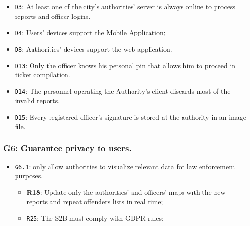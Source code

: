 \documentclass[12pt,a4paper]{article}
\begin{document}
	\begin{itemize}
			\item \texttt{D3}: At least one of the city's authorities' server is always online to process reports and officer logins.
			\item \texttt{D4}: Users' devices support the Mobile Application;
			\item \texttt{D8}: Authorities' devices support the web application.
			\item \texttt{D13}: Only the officer knows his personal pin that allows him to proceed in ticket compilation.
			\item \texttt{D14}: The personnel operating the Authority's client discards most of the invalid reports.
			\item \texttt{D15}: Every registered officer's signature is stored at the authority in an image file.
	\end{itemize}

\subsubsection{G6: Guarantee privacy to users.}
	
	\begin{itemize}
	\item \texttt{G6.1}: only allow authorities to visualize relevant data for law enforcement purposes.
							\begin{itemize}
									\item \textbf{R18}: Update only the authorities' and officers' maps with the new reports and repeat offenders lists in real time;
									\item \texttt{R25}: The S2B must comply with GDPR rules;
							\end{itemize}
	\end{itemize}

\newpage
\end{document}
